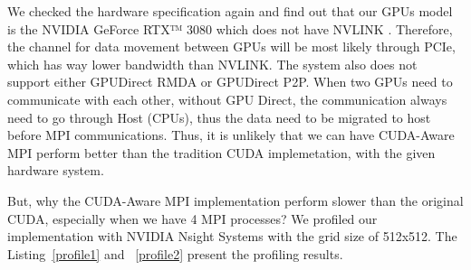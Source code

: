 \documentclass[article]{scrartcl}
\begin{document}
We checked the hardware specification again and find out that our GPUs model is the NVIDIA GeForce RTX™ 3080 which does not have NVLINK \cite{gpudirect, rtx3080}. Therefore, the channel for data movement between GPUs will be most likely through PCIe, which has way lower bandwidth than NVLINK. The system also does not support either GPUDirect RMDA or GPUDirect P2P. When two GPUs need to communicate with each other, without GPU Direct, the communication always need to go through Host (CPUs), thus the data need to be migrated to host before MPI communications. Thus, it is unlikely that we can have CUDA-Aware MPI perform better than the tradition CUDA implemetation, with the given hardware system. 


But, why the CUDA-Aware MPI implementation perform slower than the original CUDA, especially when we have 4 MPI processes? We profiled our implementation with NVIDIA Nsight Systems with the grid size of 512x512. The Listing~\ref{profile1} and ~\ref{profile2} present the profiling results.
\end{document}
